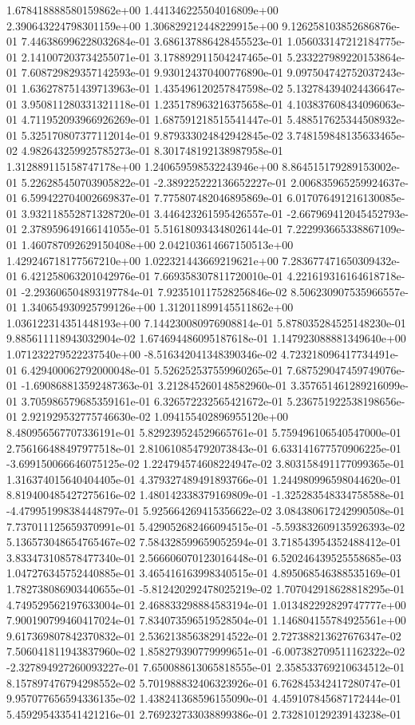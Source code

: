 1.678418888580159862e+00	1.441346225504016809e+00	2.390643224798301159e+00	1.306829212448229915e+00	9.126258103852686876e-01	7.446386996228032684e-01	3.686137886428455523e-01	1.056033147212184775e-01	2.141007203734255071e-01	3.178892911504247465e-01	5.233227989220153864e-01	7.608729829357142593e-01	9.930124370400776890e-01	9.097504742752037243e-01	1.636278751439713963e-01	1.435496120257847598e-02	5.132784394024436647e-01	3.950811280331321118e-01	1.235178963216375658e-01	4.103837608434096063e-01	4.711952093966926269e-01	1.687591218515541447e-01	5.488517625344508932e-01	5.325170807377112014e-01	9.879333024842942845e-02	3.748159848135633465e-02	4.982643259925785273e-01	8.301748192138987958e-01	1.312889115158747178e+00	1.240659598532243946e+00	8.864515179289153002e-01	5.226285450703905822e-01	-2.389225222136652227e-01	2.006835965259924637e-01	6.599422704002669837e-01	7.775807482046895869e-01	6.017076491216130085e-01	3.932118552871328720e-01	3.446423261595426557e-01	-2.667969412045452793e-01	2.378959649166141055e-01	5.516180934348026144e-01	7.222993665338867109e-01	1.460787092629150408e+00	2.042103614667150513e+00	1.429246718177567210e+00	1.022321443669219621e+00	7.283677471650309432e-01	6.421258063201042976e-01	7.669358307811720010e-01	4.221619316164618718e-01	-2.293606504893197784e-01	7.923510117528256846e-02	8.506230907535966557e-01	1.340654930925799126e+00	1.312011899145511862e+00	1.036122314351448193e+00	7.144230080976908814e-01	5.878035284525148230e-01	9.885611118943032904e-02	1.674694486095187618e-01	1.147923088881349640e+00	1.071232279522237540e+00	-8.516342041348390346e-02	4.723218096417734491e-01	6.429400062792000048e-01	5.526252537559960265e-01	7.687529047459749076e-01	-1.690868813592487363e-01	3.212845260148582960e-01	3.357651461289216099e-01	3.705986579685359161e-01	6.326572232565421672e-01	5.236751922538198656e-01	2.921929532775746630e-02	1.094155402896955120e+00	8.480956567707336191e-01	5.829239524529665761e-01	5.759496106540547000e-01	2.756166488497977518e-01	2.810610854792073843e-01	6.633141677570906225e-01	-3.699150066646075125e-02	1.224794574608224947e-02	3.803158491177099365e-01	1.316374015640404405e-01	4.379327489491893766e-01	1.244980996598044620e-01	8.819400485427275616e-02	1.480142338379169809e-01	-1.325283548334758588e-01	-4.479951998384448797e-01	5.925664269415356622e-02	3.084380617242990508e-01	7.737011125659370991e-01	5.429052682466094515e-01	-5.593832609135926393e-02	5.136573048654765467e-02	7.584328599659052594e-01	3.718543954352488412e-01	3.833473108578477340e-01	2.566606070123016448e-01	6.520246439525558685e-03	1.047276345752440885e-01	3.465416163998340515e-01	4.895068546388535169e-01	1.782738086903440655e-01	-5.812420292478025219e-02	1.707042918628818295e-01	4.749529562197633004e-01	2.468833298884583194e-01	1.013482292829747777e+00	7.900190799460417024e-01	7.834073596519528504e-01	1.146804155784925561e+00	9.617369807842370832e-01	2.536213856382914522e-01	2.727388213627676347e-02	7.506041811943837960e-02	1.858279390779999651e-01	-6.007382709511162322e-02	-2.327894927260093227e-01	7.650088613065818555e-01	2.358533769210634512e-01	8.157897476794298552e-02	5.701988832406323926e-01	6.762845342417280747e-01	9.957077656594336135e-02	1.438241368596155090e-01	4.459107845687172444e-01	5.459295433541421216e-01	2.769232733038899386e-01	2.732810129239143238e-01